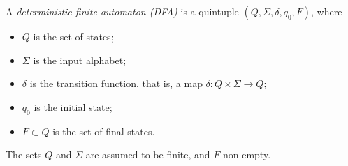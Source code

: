 \begin{dfn}
A \emph{deterministic finite automaton (DFA)} is a quintuple $(Q, \Sigma, \delta, q_0, F)$, where
\begin{itemize}
\item
$Q$ is the set of states;
\item
$\Sigma$ is the input alphabet;
\item
$\delta$ is the transition function, that is, a map $\delta \colon Q \times \Sigma \to Q$;
\item
$q_0$ is the initial state;
\item
$F \subset Q$ is the set of final states.
\end{itemize}
The sets $Q$ and $\Sigma$ are assumed to be finite, and $F$ non-empty.
\end{dfn}